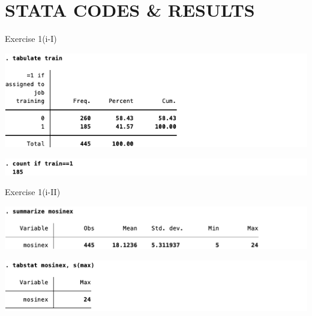 \documentclass[
  10pt,
  ignorenonframetext,
]{beamer}
\begin{document}
\hypertarget{stata-codes-results}{%
\section{STATA CODES \& RESULTS}\label{stata-codes-results}}

\begin{frame}{Exercise 1(i-I)}
\protect\hypertarget{numtrain}{}
\begin{center}\includegraphics[width=0.9\linewidth]{pictures/numtrain1} \end{center}

\begin{center}\includegraphics[width=0.9\linewidth]{pictures/numtrain2} \end{center}
\end{frame}

\begin{frame}{Exercise 1(i-II)}
\protect\hypertarget{mosinex_max}{}
\begin{center}\includegraphics[width=0.9\linewidth]{pictures/mosinex_max1} \end{center}

\begin{center}\includegraphics[width=0.9\linewidth]{pictures/mosinex_max2} \end{center}
\end{frame}
\end{document}
